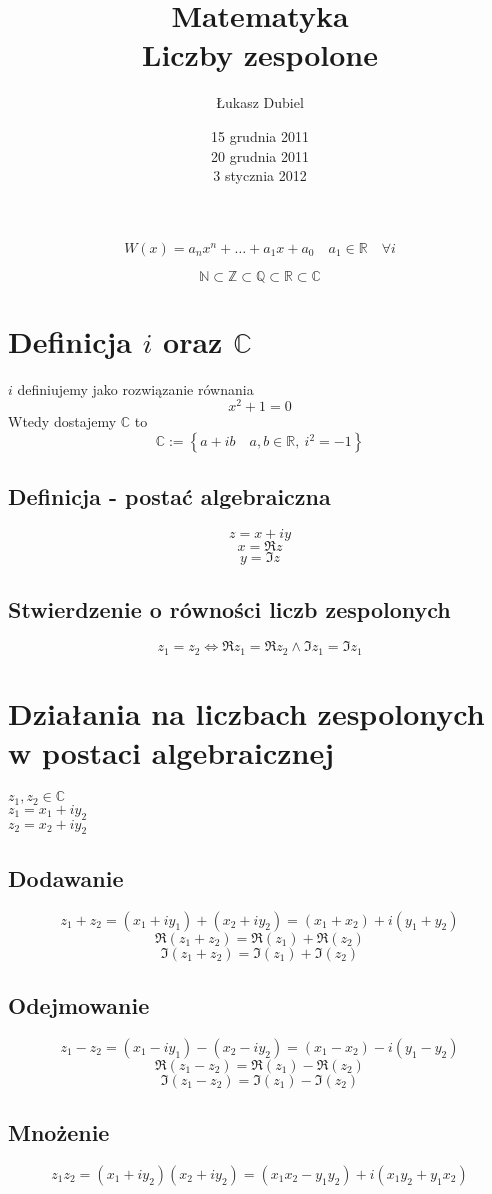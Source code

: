 \documentclass[11pt]{article}
\author{Łukasz Dubiel}
\title{Matematyka \\Liczby zespolone}
\date{15 grudnia 2011 \\ 20 grudnia 2011 \\ 3 stycznia 2012}
\begin{document}
\maketitle

$$W(x) = a_n x^n + \ldots + a_1x + a_0 \quad a_1 \in \mathbb{R} \quad \forall i$$

$$ \mathbb{N} \subset \mathbb{Z} \subset \mathbb{Q} \subset \mathbb{R} \subset \mathbb{C}$$

\section{Definicja $i$ oraz $\mathbb{C}$}
$i$ definiujemy jako rozwiązanie równania
$$x^2 + 1 = 0$$
Wtedy dostajemy $\mathbb{C}$ to
$$ \mathbb{C} := \left\lbrace a + ib \quad a,b \in \mathbb{R}, \ i^2 = -1 \right\rbrace$$
\subsection{Definicja - postać algebraiczna}
$$ z = x + iy$$
$$ x = \Re{z} $$
$$ y = \Im{z} $$
\subsection{Stwierdzenie o równości liczb zespolonych}
$$ z_1 = z_2 \iff \Re{z_1} = \Re{z_2} \wedge \Im{z_1} = \Im{z_1}$$
\section{Działania na liczbach zespolonych w postaci algebraicznej}
$z_1, z_2 \in \mathbb{C}$ \\
$z_1 = x_1 + iy_2$ \\
$z_2 = x_2 + iy_2$
\subsection{Dodawanie}
$$z_1 + z_2 = (x_1 + iy_1) + (x_2 + iy_2) = (x_1 + x_2) + i(y_1 + y_2)$$
$$\Re(z_1 + z_2) = \Re(z_1) + \Re(z_2)$$
$$\Im(z_1 + z_2) = \Im(z_1) + \Im(z_2)$$
\subsection{Odejmowanie}
$$z_1 - z_2 = (x_1 - iy_1) - (x_2 - iy_2) = (x_1 - x_2) - i(y_1 - y_2)$$
$$\Re(z_1 - z_2) = \Re(z_1) - \Re(z_2)$$
$$\Im(z_1 - z_2) = \Im(z_1) - \Im(z_2)$$
\subsection{Mnożenie}
$$z_1 z_2 = (x_1 + iy_2)(x_2 + iy_2) = (x_1x_2 - y_1y_2) + i(x_1y_2 + y_1x_2)$$
\end{document}
